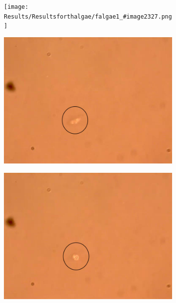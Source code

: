 \documentclass[letterpaper,12pt,oneside]{book}
\begin{document}
\begin{figure}[H]
     \centering
     \begin{subfigure}[b]{0.3\textwidth}
         \centering
         \texttt{[image: Results/Resultsforthalgae/falgae1\_\#image2327.png]}
         \caption{}
         \label{fig:y equals x}
     \end{subfigure}
     \hfill
     \begin{subfigure}[b]{0.3\textwidth}
         \centering
         \includegraphics[width=\textwidth]{Results/Resultsforthalgae/falgae2.png}
         \caption{}
         \label{fig:three sin x}
     \end{subfigure}
     \hfill
     \begin{subfigure}[b]{0.3\textwidth}
         \centering
         \includegraphics[width=\textwidth]{Results/Resultsforthalgae/falgae3.png}
         \caption{}
         \label{fig:five over x}
     \end{subfigure}
       

\end{figure}
\end{document}
